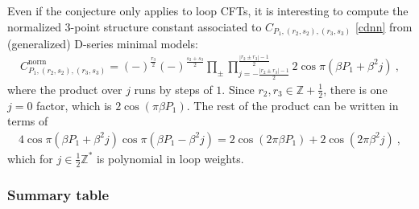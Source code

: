 \documentclass[12pt, a4paper]{article}
\theoremstyle{break}
\begin{document}
Even if the conjecture only applies to loop CFTs, it is interesting to compute the normalized 3-point structure constant associated to $C_{P_1,(r_2,s_2),(r_3,s_3)}$ \eqref{cdnn} from (generalized) D-series minimal models:
\begin{align}
 C^\text{norm}_{P_1,(r_2,s_2),(r_3,s_3)} = (-)^{\frac{r_3}{2}}(-)^{\frac{s_2+s_3}{2}} \prod_\pm \prod_{j=-\frac{|r_2\pm r_3|-1}{2}}^{\frac{|r_2\pm r_3|-1}{2}} 2\cos \pi(\beta P_1+\beta^2j) \ ,
\end{align}
where the product over $j$ runs by steps of $1$. Since $r_2,r_3\in\mathbb{Z}+\frac12$, there is one $j=0$ factor, which is $2\cos(\pi \beta P_1)$. The rest of the product can be written in terms of 
\begin{align}
 4\cos \pi(\beta P_1+\beta^2j)\cos \pi(\beta P_1-\beta^2j) = 2\cos(2\pi\beta P_1)+2\cos(2\pi \beta^2j)\ , 
\end{align}
which for $j\in\frac12\mathbb{Z}^*$ is polynomial in loop weights. 

\subsubsection{Summary table}\label{sec:table}
\end{document}
